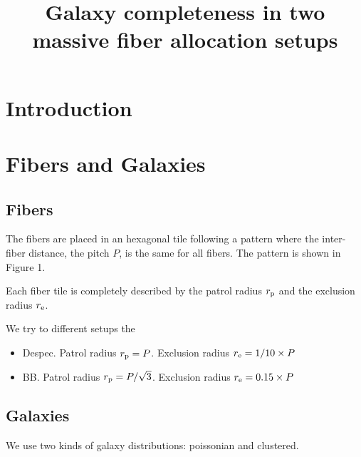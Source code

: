 \documentclass{article}
\title{Galaxy completeness in two massive fiber allocation setups}
\begin{document}
\maketitle
\section{Introduction}

\section{Fibers and Galaxies}

\subsection{Fibers}

The fibers are placed in an hexagonal tile following a pattern where
the inter-fiber distance, the pitch $P$, is the same for all
fibers. The pattern is shown in Figure 1. 

Each fiber tile is completely described by the patrol radius $r_{\rm
  p}$ and the exclusion radius $r_{\rm e}$.


We try to different setups the 
\begin{itemize}
\item {\rm Despec}. Patrol radius $r_{\rm p}=P$. Exclusion radius
  $r_{\rm e}=1/10\times P$
\item {\rm BB}. Patrol radius $r_{\rm p}=P/\sqrt{3}$. Exclusion radius
  $r_{\rm e}=0.15 \times P$
\end{itemize}

\subsection{Galaxies}
We use two kinds of galaxy distributions: poissonian and clustered. \\ 
\end{document}
